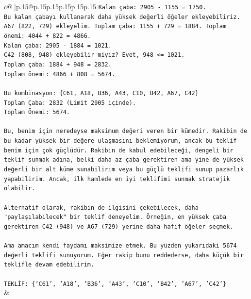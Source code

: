 \documentclass{article}
\begin{document}
{\begin{supertabular}{c@{$\;$}|p{.15\linewidth}@{}p{.15\linewidth}p{.15\linewidth}p{.15\linewidth}p{.15\linewidth}p{.15\linewidth}}
{{{\texttt{Kalan çaba: 2905 {-} 1155 = 1750.} \\
\texttt{Bu kalan çabayı kullanarak daha yüksek değerli öğeler ekleyebiliriz.} \\
\texttt{A67 (822, 729) ekleyelim. Toplam çaba: 1155 + 729 = 1884. Toplam önemi: 4044 + 822 = 4866.} \\
\texttt{Kalan çaba: 2905 {-} 1884 = 1021.} \\
\texttt{C42 (808, 948) ekleyebilir miyiz? Evet, 948 <= 1021.} \\
\texttt{Toplam çaba: 1884 + 948 = 2832.} \\
\texttt{Toplam önemi: 4866 + 808 = 5674.} \\
\\ 
\texttt{Bu kombinasyon: \{C61, A18, B36, A43, C10, B42, A67, C42\}} \\
\texttt{Toplam Çaba: 2832 (Limit 2905 içinde).} \\
\texttt{Toplam Önemi: 5674.} \\
\\ 
\texttt{Bu, benim için neredeyse maksimum değeri veren bir kümedir. Rakibin de bu kadar yüksek bir değere ulaşmasını beklemiyorum, ancak bu teklif benim için çok güçlüdür. Rakibin de kabul edebileceği, dengeli bir teklif sunmak adına, belki daha az çaba gerektiren ama yine de yüksek değerli bir alt küme sunabilirim veya bu güçlü teklifi sunup pazarlık yapabilirim. Ancak, ilk hamlede en iyi teklifimi sunmak stratejik olabilir.} \\
\\ 
\texttt{Alternatif olarak, rakibin de ilgisini çekebilecek, daha "paylaşılabilecek" bir teklif deneyelim. Örneğin, en yüksek çaba gerektiren C42 (948) ve A67 (729) yerine daha hafif öğeler seçmek.} \\
\\ 
\texttt{Ama amacım kendi faydamı maksimize etmek. Bu yüzden yukarıdaki 5674 değerli teklifi sunuyorum. Eğer rakip bunu reddederse, daha küçük bir teklifle devam edebilirim.} \\
\\ 
\texttt{TEKLİF: \{'C61', 'A18', 'B36', 'A43', 'C10', 'B42', 'A67', 'C42'\}} \\
            }
        }
    }
    & \\ \\


\end{supertabular}}
\end{document}
